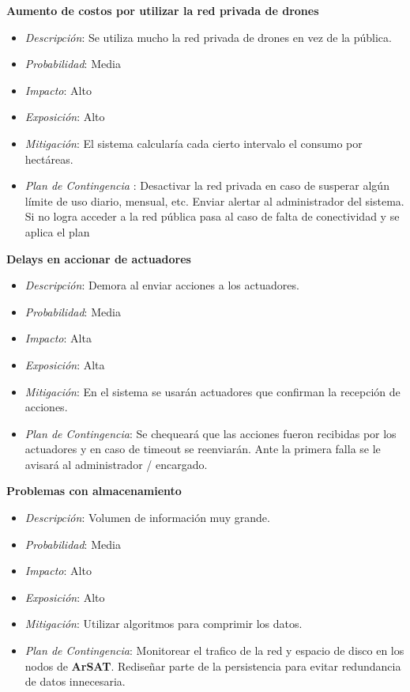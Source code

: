 \textbf{Aumento de costos por utilizar la red privada de drones}
\begin{itemize}
 \item \textsl{Descripci\'on}: Se utiliza mucho la red privada de drones en vez de la pública.
 \item \textsl{Probabilidad}: Media
 \item \textsl{Impacto}: Alto
 \item \textsl{Exposición}: Alto
 \item \textsl{Mitigación}: El sistema calcularía cada cierto intervalo el consumo por hect\'areas.
 \item \textsl{Plan de Contingencia} : Desactivar la red privada en caso de susperar algún límite de uso diario, mensual, etc. Enviar alertar al administrador del sistema. Si no logra acceder a la red pública pasa al caso de falta de conectividad y se aplica el plan 
\end{itemize}

\clearpage

\textbf{Delays en accionar de actuadores}
\begin{itemize}
 \item \textsl{Descripci\'on}: Demora al enviar acciones a los actuadores.
 \item \textsl{Probabilidad}: Media
 \item \textsl{Impacto}: Alta
 \item \textsl{Exposición}: Alta
 \item \textsl{Mitigación}: En el sistema se usarán actuadores que confirman la recepci\'on de acciones.
 \item \textsl{Plan de Contingencia}: Se chequeará que las acciones fueron recibidas por los actuadores y en caso de timeout se reenviarán. Ante la primera falla se le avisar\'a al administrador / encargado.
\end{itemize}

\textbf{Problemas con almacenamiento}
\begin{itemize}
 \item \textsl{Descripci\'on}: Volumen de informaci\'on muy grande.
 \item \textsl{Probabilidad}: Media
 \item \textsl{Impacto}: Alto
 \item \textsl{Exposición}: Alto
 \item \textsl{Mitigación}: Utilizar algoritmos para comprimir los datos.
 \item \textsl{Plan de Contingencia}: Monitorear el trafico de la red y espacio de disco en los nodos de \textbf{ArSAT}. Rediseñar parte de la persistencia para evitar redundancia de datos innecesaria.
\end{itemize}
